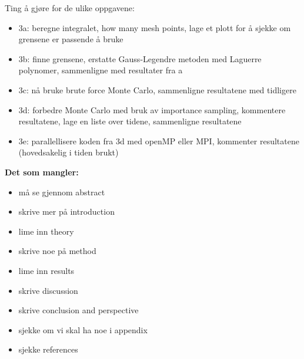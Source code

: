 \documentclass{article}
\begin{document}
Ting å gjøre for de ulike oppgavene:
\begin{itemize}

  \item 3a: beregne integralet, how many mesh points, lage et plott for å sjekke om grensene er passende å bruke \\

  \item 3b: finne grensene, erstatte Gauss-Legendre metoden med Laguerre polynomer, sammenligne med resultater fra a \\

  \item 3c: nå bruke brute force Monte Carlo, sammenligne resultatene med tidligere \\

  \item 3d: forbedre Monte Carlo med bruk av importance sampling, kommentere resultatene, lage en liste over tidene, sammenligne resultatene \\

  \item 3e: parallellisere koden fra 3d med openMP eller MPI, kommenter resultatene (hovedsakelig i tiden brukt)

\end{itemize}

\vspace{1cm}

\textbf{Det som mangler:}

\begin{itemize}
    \item må se gjennom abstract \\
    \item skrive mer på introduction \\
    \item lime inn theory \\
    \item skrive noe på method \\
    \item lime inn results \\
    \item skrive discussion \\
    \item skrive conclusion and perspective \\
    \item sjekke om vi skal ha noe i appendix \\
    \item sjekke references \\
\end{itemize}
\end{document}

